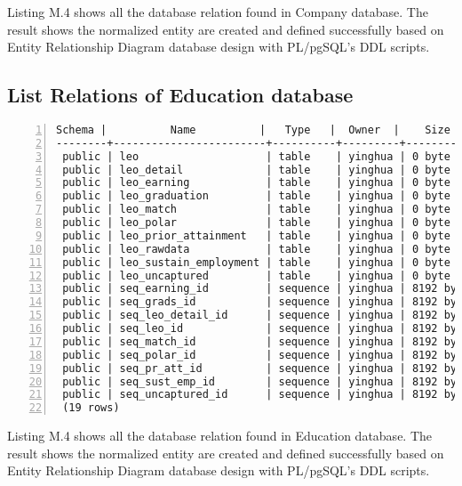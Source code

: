 Listing M.4 shows all the database relation found in Company database. The result shows the normalized entity are created and defined successfully based on Entity Relationship Diagram database design with PL/pgSQL's DDL scripts. 

\newpage

\subsection{List Relations of Education database}

\lstset{basicstyle=\ttfamily\tiny}  
\begin{lstlisting}[breaklines, frame=single, numbers=left, caption={List all relations in Education database.}, label=commandline-02]
 Schema |          Name          |   Type   |  Owner  |    Size    | Description 
--------+------------------------+----------+---------+------------+-------------
 public | leo                    | table    | yinghua | 0 byte	   |
 public | leo_detail             | table    | yinghua | 0 byte	   |
 public | leo_earning            | table    | yinghua | 0 byte	   |
 public | leo_graduation         | table    | yinghua | 0 byte	   |
 public | leo_match              | table    | yinghua | 0 byte	   |
 public | leo_polar              | table    | yinghua | 0 byte	   |
 public | leo_prior_attainment   | table    | yinghua | 0 byte	   |
 public | leo_rawdata            | table    | yinghua | 0 byte	   |
 public | leo_sustain_employment | table    | yinghua | 0 byte	   |
 public | leo_uncaptured         | table    | yinghua | 0 byte	   | 
 public | seq_earning_id         | sequence | yinghua | 8192 bytes | 
 public | seq_grads_id           | sequence | yinghua | 8192 bytes | 
 public | seq_leo_detail_id      | sequence | yinghua | 8192 bytes | 
 public | seq_leo_id             | sequence | yinghua | 8192 bytes | 
 public | seq_match_id           | sequence | yinghua | 8192 bytes | 
 public | seq_polar_id           | sequence | yinghua | 8192 bytes | 
 public | seq_pr_att_id          | sequence | yinghua | 8192 bytes | 
 public | seq_sust_emp_id        | sequence | yinghua | 8192 bytes | 
 public | seq_uncaptured_id      | sequence | yinghua | 8192 bytes | 
 (19 rows)

\end{lstlisting}

Listing M.4 shows all the database relation found in Education database. The result shows the normalized entity are created and defined successfully based on Entity Relationship Diagram database design with PL/pgSQL's DDL scripts. 

\newpage




